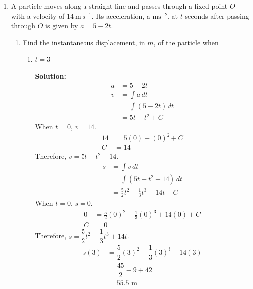 \documentclass{report}
\newcommand{\sol}{\textbf{Solution:}}
\begin{document}
\begin{enumerate}[leftmargin=*]
    \item A particle moves along a straight line and passes through a fixed point $O$
          with a velocity of $14 \mathrm{~m} \mathrm{~s}^{-1}$. Its acceleration, a
          $\mathrm{m} \mathrm{s}^{-2}$, at $t$ seconds after passing through $O$ is given
          by $a=5-2 t$.
          \begin{enumerate}
              \item Find the instantaneous displacement, in $m$, of the particle when
                    \begin{enumerate}
                        \item $t=3$

                              \sol{}
                              \begin{align*}
                                  a & = 5 - 2t            \\
                                  v & = \int a \, dt      \\
                                    & = \int (5-2t) \, dt \\
                                    & = 5t - t^2 + C
                              \end{align*}
                              When $t=0$, $v=14$.
                              \begin{align*}
                                  14 & = 5(0) - (0)^2 + C \\
                                  C  & = 14
                              \end{align*}
                              Therefore, $v=5t-t^2+14$.
                              \begin{align*}
                                  s & = \int v \, dt                              \\
                                    & = \int (5t-t^2+14) \, dt                    \\
                                    & = \frac{5}{2}t^2 - \frac{1}{3}t^3 + 14t + C
                              \end{align*}
                              When $t=0$, $s=0$.
                              \begin{align*}
                                  0 & = \frac{5}{2}(0)^2 - \frac{1}{3}(0)^3 + 14(0) + C \\
                                  C & = 0
                              \end{align*}
                              Therefore, $s=\dfrac{5}{2}t^2 - \dfrac{1}{3}t^3 + 14t$.
                              \begin{align*}
                                  s(3) & = \dfrac{5}{2}(3)^2 - \dfrac{1}{3}(3)^3 + 14(3) \\
                                       & = \dfrac{45}{2} - 9 + 42                        \\
                                       & = 55.5 \text{ m}
                              \end{align*}


\end{enumerate}
\end{enumerate}
\end{enumerate}
\end{document}
